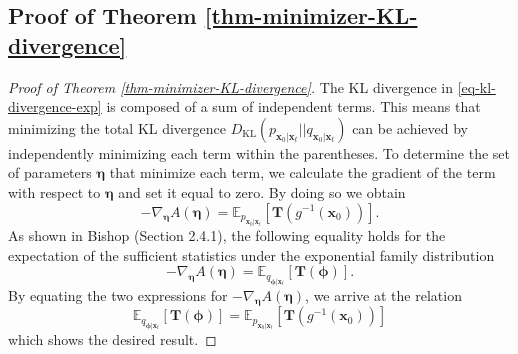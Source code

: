 \subsection{Proof of Theorem \ref{thm-minimizer-KL-divergence}} \label{sec:proof_thm-minimizer-KL-divergence}

\begin{proof}[Proof of Theorem \ref{thm-minimizer-KL-divergence}]
The KL divergence in \eqref{eq-kl-divergence-exp} is composed of a sum of independent terms. This means that minimizing the total KL divergence $D_{\text{KL}}(p_{\mathbf{x}_{0}\vert \mathbf{x}_{t}} \vert\vert q_{\mathbf{x}_{0}\vert \mathbf{x}_{t}})$ can be achieved by independently minimizing each term within the parentheses. To determine the set of parameters $\boldsymbol{\eta}$ that minimize each term, we calculate the gradient of the term with respect to 
$\boldsymbol{\eta}$	and set it equal to zero. By doing so we obtain
\begin{equation}
    -\nabla_{\boldsymbol{\eta}} A(\boldsymbol{\eta}) = \mathbb{E}_{p_{\mathbf{x}_{0}\vert \mathbf{x}_{t}}}[ \mathbf{T}(g^{-1}(\mathbf{x}_{0}))].
\end{equation}
As shown in Bishop (Section 2.4.1), the following equality holds for the expectation of the sufficient statistics under the exponential family distribution
\begin{equation}
-\nabla_{\boldsymbol{\eta}} A(\boldsymbol{\eta})  = \mathbb{E}_{q_{\boldsymbol{\phi}\vert \mathbf{x}_t}}[\mathbf{T}(\boldsymbol{\phi})].
\end{equation}
By equating the two expressions for $-\nabla_{\boldsymbol{\eta}} A(\boldsymbol{\eta})$, we arrive at the relation
\begin{equation}
\mathbb{E}_{q_{\boldsymbol{\phi}\vert \mathbf{x}_t}}[\mathbf{T}(\boldsymbol{\phi})] = \mathbb{E}_{p_{\mathbf{x}_{0}\vert \mathbf{x}_{t}}}[ \mathbf{T}(g^{-1}(\mathbf{x}_{0}))]
\end{equation}
which shows the desired result. 
\end{proof}
